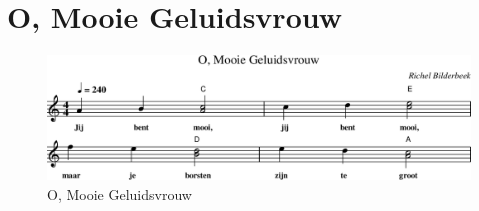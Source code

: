 \chapter{O, Mooie Geluidsvrouw}



\begin{figure}[!htbp]
  \includegraphics[width=\textwidth,height=\textheight,keepaspectratio]{../songs/12_o_mooie_geluidsvrouw.png}
  \caption{O, Mooie Geluidsvrouw}
  \label{fig:12_o_mooie_geluidsvrouw}
\end{figure}
